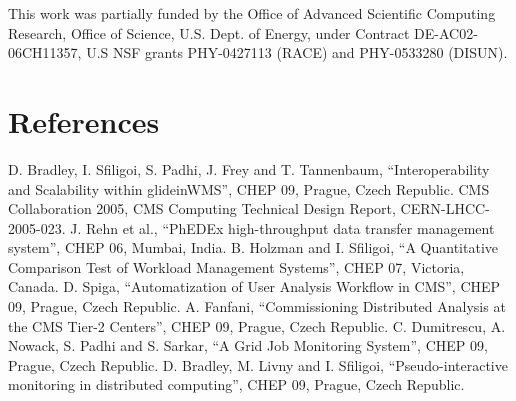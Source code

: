 \documentclass[a4paper]{jpconf}
\begin{document}
\ack
This work was partially funded by the Office of Advanced Scientific Computing
Research, Office of Science, U.S. Dept. of Energy, under Contract
DE-AC02-06CH11357, U.S NSF grants PHY-0427113 (RACE) and PHY-0533280 (DISUN).
\section*{References}
\begin{thebibliography}{15}

D. Bradley, I. Sfiligoi, S. Padhi, J. Frey and T. Tannenbaum, ``Interoperability and Scalability within glideinWMS'', CHEP 09, Prague, Czech Republic.
CMS Collaboration 2005, CMS Computing Technical Design Report, CERN-LHCC-2005-023.
J. Rehn et al., ``PhEDEx high-throughput data transfer management system'', CHEP 06, Mumbai, India.
B. Holzman and I. Sfiligoi, ``A Quantitative Comparison Test of Workload Management Systems'', CHEP 07, Victoria, Canada. 
D. Spiga, ``Automatization of User Analysis Workflow in CMS'', CHEP 09, Prague, Czech Republic.
A. Fanfani, ``Commissioning Distributed Analysis at the CMS Tier-2 Centers'', CHEP 09, Prague, Czech Republic.
C. Dumitrescu, A. Nowack, S. Padhi and S. Sarkar, ``A Grid Job Monitoring System'', CHEP 09, Prague, Czech Republic.
D. Bradley, M. Livny and I. Sfiligoi, ``Pseudo-interactive monitoring in distributed computing'', CHEP 09, Prague, Czech Republic.
\end{thebibliography}
\end{document}
